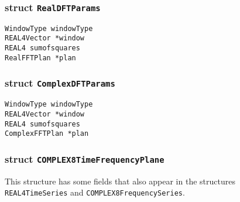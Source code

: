 \subsubsection*{struct \texttt{RealDFTParams}}

\noindent

\begin{description}
\item[\texttt{WindowType windowType}]
\item[\texttt{REAL4Vector *window}]
\item[\texttt{REAL4 sumofsquares}]
\item[\texttt{RealFFTPlan *plan}]
\end{description}

\subsubsection*{struct \texttt{ComplexDFTParams}}

\noindent

\begin{description}
\item[\texttt{WindowType  windowType}]
\item[\texttt{REAL4Vector   *window}]
\item[\texttt{REAL4  sumofsquares}]
\item[\texttt{ComplexFFTPlan  *plan}]
\end{description}

\subsubsection*{struct \texttt{COMPLEX8TimeFrequencyPlane}}

\noindent
This structure has some fields that also appear in the structures
\verb+REAL4TimeSeries+ and \verb+COMPLEX8FrequencySeries+.


